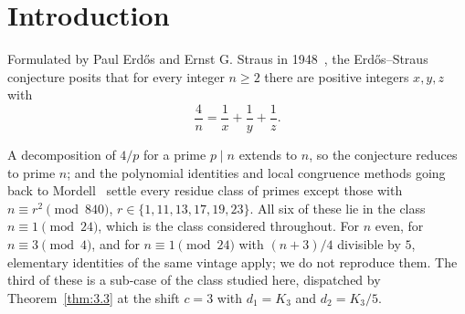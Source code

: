 \documentclass[11pt, a4paper]{article}
\theoremstyle{plain}
\theoremstyle{definition}
\begin{document}
\begin{abstract}
Third, a factorization-free procedure decides the conjecture for all primes of an interval $[N,2N]$. In its unsplit form, its Type~II pass costs $\mathcal{O}(N(\log N)^{3})$ while its Type~I pass costs $\Theta(N^{2})$, which locates the whole quadratic cost in the extraction of the divisors of $4u^{2}d+1$ and exhibits an asymmetry between the two halves of the Type~I/Type~II dichotomy. Truncating the Type~I pass at $u\le N^{1/3}$ and transferring the remaining large-$u$ parameter space to the sparse residual set left by the large sieve yields an unconditional, factorization-free batch decision procedure running in $\mathcal{O}\big(N^{2}(\log N)^{2}\exp(-c_0(\log N)^{2/3})\big)=\mathcal{O}\big(N^{2}\exp(-(c_0-o(1))(\log N)^{2/3})\big)=o(N^{2})$ arithmetic operations. Finally, an exact two-variable Dirichlet series evaluation triples the leading constant in the large-sieve trade-off to $\kappa_1^{\ast}=9/(2\pi^{2})$, improving the Bombieri--Vinogradov density bound to $\mathcal{O}\big(N\exp(-0.0942(\log N)^{2/3})\big)$ at the uniform cutoff $p>J^{5}$ (and to $\mathcal{O}_\varepsilon\big(N\exp(-(0.1093-\varepsilon)(\log N)^{2/3})\big)$ at $p>J^{4+\varepsilon}$), while Proposition~\ref{prop:optimality_23} establishes $(\log N)^{2/3}$ as the $\tau_3$-type ceiling of the single-prime two-parameter witness system. The conjecture itself remains open.
\end{abstract}


\section{Introduction} \label{sec:intro}

Formulated by Paul Erdős and Ernst G. Straus in 1948~\cite{erdos_straus}, the Erdős--Straus conjecture posits that for every integer $n\ge2$ there are positive integers $x,y,z$ with
\begin{equation} \label{eq:erdos_straus}
\frac{4}{n}=\frac{1}{x}+\frac{1}{y}+\frac{1}{z}.
\end{equation}

A decomposition of $4/p$ for a prime $p\mid n$ extends to $n$, so the conjecture reduces to prime $n$; and the polynomial identities and local congruence methods going back to Mordell~\cite{mordell1969} settle every residue class of primes except those with $n\equiv r^{2}\pmod{840}$, $r\in\{1,11,13,17,19,23\}$. All six of these lie in the class $n\equiv1\pmod{24}$, which is the class considered throughout. For $n$ even, for $n\equiv3\pmod 4$, and for $n\equiv1\pmod{24}$ with $(n+3)/4$ divisible by $5$, elementary identities of the same vintage apply; we do not reproduce them. The third of these is a sub-case of the class studied here, dispatched by Theorem~\ref{thm:3.3} at the shift $c=3$ with $d_1=K_3$ and $d_2=K_3/5$.
\end{document}
